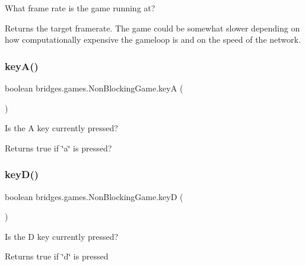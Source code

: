 What frame rate is the game running at? 

\begin{DoxyReturn}{Returns}
the target framerate. The game could be somewhat slower depending on how computationally expensive the gameloop is and on the speed of the network. 
\end{DoxyReturn}
\mbox{\label{classbridges_1_1games_1_1_non_blocking_game_a4328a21ca65c26e11161dfe362770917}} 
\subsubsection{\texorpdfstring{keyA()}{keyA()}}
{\footnotesize\ttfamily boolean bridges.\+games.\+Non\+Blocking\+Game.\+keyA (\begin{DoxyParamCaption}{ }\end{DoxyParamCaption})\hspace{0.3cm}{\ttfamily [protected]}}



Is the A key currently pressed? 

\begin{DoxyReturn}{Returns}
true if \char`\"{}a\char`\"{} is pressed? 
\end{DoxyReturn}
\mbox{\label{classbridges_1_1games_1_1_non_blocking_game_a830a2e8127b042f8915deb61f0038f2a}} 
\subsubsection{\texorpdfstring{keyD()}{keyD()}}
{\footnotesize\ttfamily boolean bridges.\+games.\+Non\+Blocking\+Game.\+keyD (\begin{DoxyParamCaption}{ }\end{DoxyParamCaption})\hspace{0.3cm}{\ttfamily [protected]}}



Is the D key currently pressed? 

\begin{DoxyReturn}{Returns}
true if \char`\"{}d\char`\"{} is pressed 
\end{DoxyReturn}
\mbox{\label{classbridges_1_1games_1_1_non_blocking_game_ac59c5ac18a456cc1d69ec8d42a311840}} 
